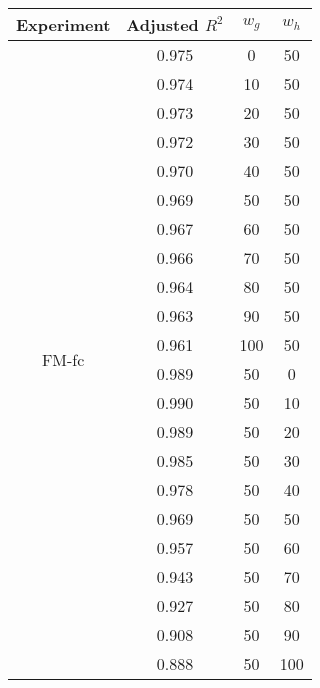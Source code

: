 \documentclass{article}
\begin{document}
\begin{table}[h]
  \centering
  \begin{tabular}{c c c c}
    \toprule
    Experiment                & Adjusted $R^2$ & $w_g$ & $w_h$ \\
    \midrule
    \multirow{22}{*}{FM-fc} & 0.975 & 0 & 50 \\
                              & 0.974 & 10  & 50 \\
                              & 0.973 & 20  & 50 \\
                              & 0.972 & 30  & 50 \\
                              & 0.970 & 40  & 50 \\
                              & 0.969 & 50  & 50 \\
                              & 0.967 & 60  & 50 \\
                              & 0.966 & 70  & 50 \\
                              & 0.964 & 80  & 50 \\
                              & 0.963 & 90  & 50 \\
                              & 0.961 & 100 & 50 \\
                              & 0.989 & 50  & 0 \\
                              & 0.990 & 50  & 10 \\
                              & 0.989 & 50  & 20 \\
                              & 0.985 & 50  & 30 \\
                              & 0.978 & 50  & 40 \\
                              & 0.969 & 50  & 50 \\
                              & 0.957 & 50  & 60 \\
                              & 0.943 & 50  & 70 \\
                              & 0.927 & 50  & 80 \\
                              & 0.908 & 50  & 90 \\
                              & 0.888 & 50  & 100 \\
    \bottomrule
  \end{tabular}
\end{table}
\end{document}

